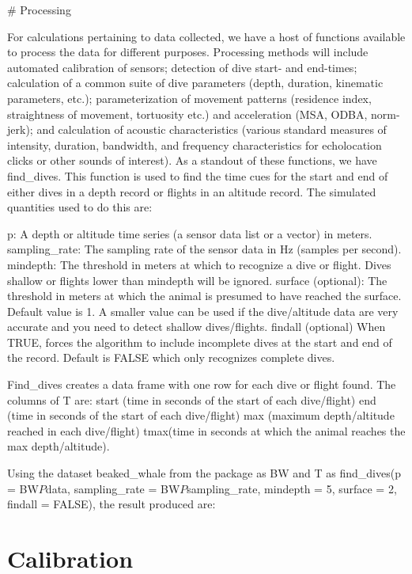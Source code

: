 \citep{Wilmers:2015}
\# Processing

For calculations pertaining to data collected, we have a host of functions available to process the data for different purposes. Processing methods will include automated calibration of sensors; detection of dive start- and end-times; calculation of a common suite of dive parameters (depth, duration, kinematic parameters, etc.); parameterization of movement patterns (residence index, straightness of movement, tortuosity etc.) and acceleration (MSA, ODBA, norm-jerk); and calculation of acoustic characteristics (various standard measures of intensity, duration, bandwidth, and frequency characteristics for echolocation clicks or other sounds of interest). As a standout of these functions, we have find\_dives. This function is used to find the time cues for the start and end of either dives in a depth record or flights in an altitude record. The simulated quantities used to do this are:

p: A depth or altitude time series (a sensor data list or a vector) in meters.
sampling\_rate: The sampling rate of the sensor data in Hz (samples per second).
mindepth: The threshold in meters at which to recognize a dive or flight. Dives shallow or flights lower than mindepth will be ignored.
surface (optional): The threshold in meters at which the animal is presumed to have reached the surface. Default value is 1. A smaller value can be used if the dive/altitude data are very accurate and you need to detect shallow dives/flights.
findall (optional) When TRUE, forces the algorithm to include incomplete dives at the start and end of the record. Default is FALSE which only recognizes complete dives.

Find\_dives creates a data frame with one row for each dive or flight found. The columns of T are:
start (time in seconds of the start of each dive/flight)
end (time in seconds of the start of each dive/flight)
max (maximum depth/altitude reached in each dive/flight)
tmax(time in seconds at which the animal reaches the max depth/altitude).

Using the dataset beaked\_whale from the package as BW and
T as find\_dives(p = BW\(P\)data, sampling\_rate = BW\(P\)sampling\_rate, mindepth = 5, surface = 2, findall = FALSE), the result produced are:

\hypertarget{calibration}{%
\section{Calibration}\label{calibration}}

